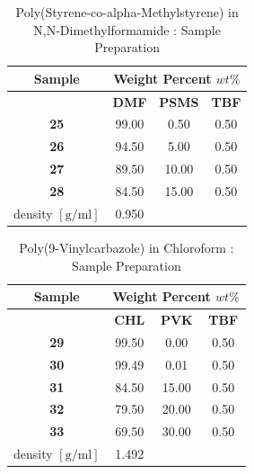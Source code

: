 \begin{table}[!th]
\centering
\caption[Poly(Styrene-co-alpha-Methylstyrene) in N,N-Dimethylformamide : Sample Preparation]{Poly(Styrene-co-alpha-Methylstyrene) in N,N-Dimethylformamide : Sample Preparation}
\begin{tabular}{cccc}
\hline
\textbf{Sample} & \multicolumn{3}{c}{\textbf{Weight Percent} $wt\%$} \\
\hline
{}          & \textbf{DMF} & \textbf{PSMS} & \textbf{TBF} \\
\textbf{25} & 99.00        &  0.50         & 0.50         \\
\textbf{26} & 94.50        &  5.00         & 0.50         \\
\textbf{27} & 89.50        & 10.00         & 0.50         \\
\textbf{28} & 84.50        & 15.00         & 0.50         \\
\hline
density $[\textrm{g} / \textrm{ml}]$
   & 0.950        & {}           & {}           \\
\hline
\end{tabular}
\label{tab:PSMSinDMF}
\end{table}

\begin{table}[!th]
\centering
\caption[Poly(9-Vinylcarbazole) in Chloroform : Sample Preparation]{Poly(9-Vinylcarbazole) in Chloroform : Sample Preparation}
\begin{tabular}{cccc}
\hline
\textbf{Sample} & \multicolumn{3}{c}{\textbf{Weight Percent} $wt\%$} \\
\hline
{}          & \textbf{CHL} & \textbf{PVK} & \textbf{TBF} \\
\textbf{29} & 99.50        &  0.00        & 0.50         \\
\textbf{30} & 99.49        &  0.01        & 0.50         \\
\textbf{31} & 84.50        & 15.00        & 0.50         \\
\textbf{32} & 79.50        & 20.00        & 0.50         \\
\textbf{33} & 69.50        & 30.00        & 0.50         \\
\hline
density $[\textrm{g} / \textrm{ml}]$
            & 1.492        & {}           & {}           \\
\hline
\end{tabular}
\label{tab:PVKinCHL}
\end{table}

